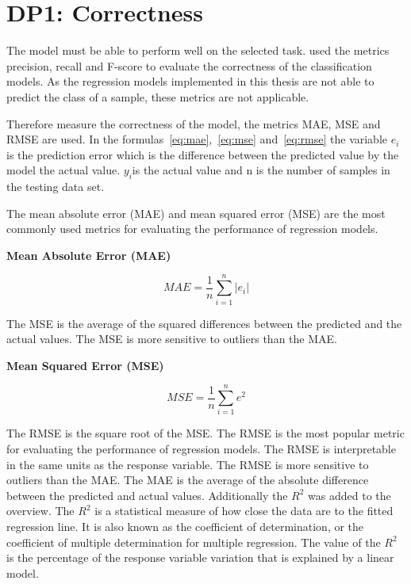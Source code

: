 \section{DP1: Correctness}\label{sec:dp1:-correctness}


The model must be able to perform well on the selected task.
\cite{siebert2022construction} used the metrics precision, recall and F-score
to evaluate the correctness of the classification models.
As the regression models implemented in this thesis are not able to predict
the class of a sample, these metrics are not applicable.

Therefore measure the correctness of the model, the metrics MAE, MSE and RMSE are used.
In the formulas~\ref{eq:mae},~\ref{eq:mse} and~\ref{eq:rmse} the variable
\(e_i\) is the prediction
error which is the difference between the predicted value by the model the
actual value.
\(y_i\)is the actual value and n is the number of samples in the testing
data set.

The mean absolute error (MAE) and mean squared error (MSE) are the most
commonly used metrics for
evaluating the performance of regression models.

\textbf{Mean Absolute Error (MAE)}

\begin{tcolorbox}[arc=0pt,boxrule=0.5pt]
    \begin{equation}
        MAE = \frac{1}{n} \sum_{i=1}^{n} |e_i|
        \label{eq:mae}
    \end{equation}
\end{tcolorbox}

The MSE is the average of the squared differences between the predicted and
the actual values.
The MSE is more sensitive to outliers than the MAE.

\textbf{Mean Squared Error (MSE)}

\begin{tcolorbox}[arc=0pt,boxrule=0.5pt]
    \begin{equation}
        \label{eq:mse}
        MSE = \frac{1}{n} \sum_{i=1}^{n} e^2
    \end{equation}
\end{tcolorbox}

The RMSE is the square root of the MSE. The RMSE is the most popular metric
for evaluating the
performance of regression models. The RMSE is interpretable in the same units
as the response
variable. The RMSE is more sensitive to outliers than the MAE.
The MAE is the average of the absolute difference between the predicted and
actual values.
Additionally the \(R^2\) was added to the overview. The \(R^2\) is a statistical
measure of how close
the data are to the fitted regression line. It is also known as the
coefficient of determination,
or the coefficient of multiple determination for multiple regression. The
value of the \(R^2\) is
the percentage of the response variable variation that is explained by a
linear model.

